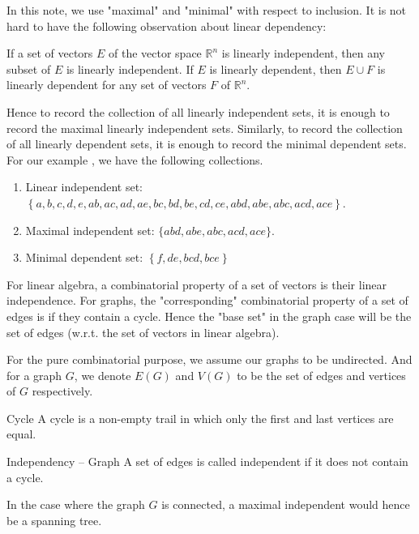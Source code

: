 \documentclass[a4paper,10pt]{article}
\begin{document}
In this note, we use "maximal" and "minimal" with respect to inclusion. It is not hard to have the following observation about linear dependency:

\begin{lemma}{}
  If a set of vectors $E$ of the vector space $\mathbb{R}^n$ is linearly independent, then any subset of $E$ is linearly independent. If $E$ is linearly dependent, then $E\cup F$ is linearly dependent for any set of vectors $F$ of $\mathbb{R}^n$.
\end{lemma}

Hence to record the collection of all linearly independent sets, it is enough to record the maximal linearly independent sets. Similarly, to record the collection of all linearly dependent sets, it is enough to record the minimal dependent sets. For our example , we have the following collections.

\begin{enumerate}
  \item Linear independent set: $\left\{a,b,c,d,e,ab,ac,ad,ae,bc,bd,be,cd,ce,abd,abe,abc,acd,ace\right\}$.
  \item Maximal independent set: $\{abd,abe,abc,acd,ace\}$.
  \item Minimal dependent set: $\left\{f,de,bcd,bce\right\}$
\end{enumerate}


For linear algebra, a combinatorial property of a set of vectors is their linear independence. For graphs, the "corresponding" combinatorial property of a set of edges is if they contain a cycle. Hence the "base set" in the graph case will be the set of edges (w.r.t. the set of vectors in linear algebra).

For the pure combinatorial purpose, we assume our graphs to be undirected. And for a graph $G$, we denote $E(G)$ and $V(G)$ to be the set of edges and vertices of $G$ respectively.

\begin{definition}[def:]{Cycle}
  A cycle is a non-empty trail in which only the first and last vertices are equal.
\end{definition}

\begin{definition}[def:]{Independency -- Graph}
  A set of edges is called independent if it does not contain a cycle.
  \begin{remark}
    In the case where the graph $G$ is connected, a maximal independent would hence be a spanning tree.
  \end{remark}
\end{definition}
\end{document}

